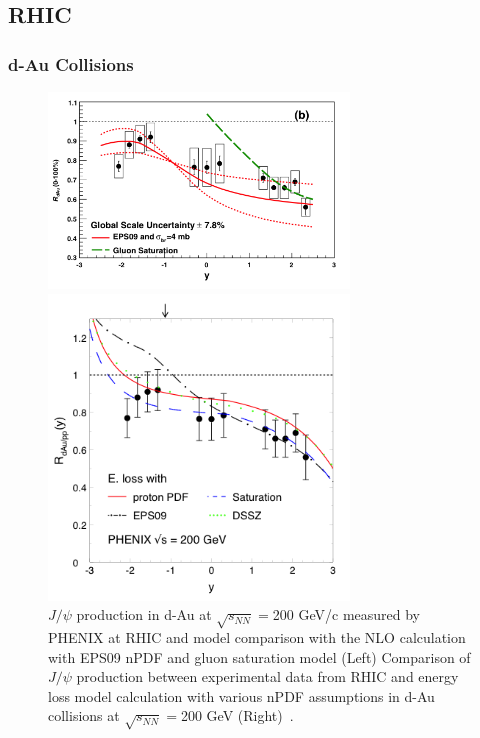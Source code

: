 \subsection{RHIC}
\label{rhic}
\subsubsection{d-Au Collisions}
\label{sec_2_dau}
\begin{figure}[!h]
  \begin{minipage}{0.5\hsize}
    \begin{center}
      \includegraphics[width=8cm]{chap2/figure/experimentaldata/jpsi_phenixdAu.png}
    \end{center}
  \end{minipage}
  \begin{minipage}{0.5\hsize}
    \begin{center}
      \includegraphics[width=8cm]{chap2/figure/eloss/eloss_rhic.png}
    \end{center}
  \end{minipage}
  \caption{
    $J/\psi$ production in d-Au at $\sqrt{s_{NN}}=$200 GeV/c measured by PHENIX at RHIC and model comparison with the NLO calculation with EPS09 nPDF and gluon saturation model (Left) Comparison of $J/\psi$ production between experimental data from RHIC and energy loss model calculation with various nPDF assumptions in d-Au collisions at $\sqrt{s_{NN}}=$200 GeV (Right)~\cite{bib_rhicjpsirdauvsy,bib_rhicjpsirdauvspt}. 
  }
  \label{fig_2_jpsiparhic}
\end{figure}
